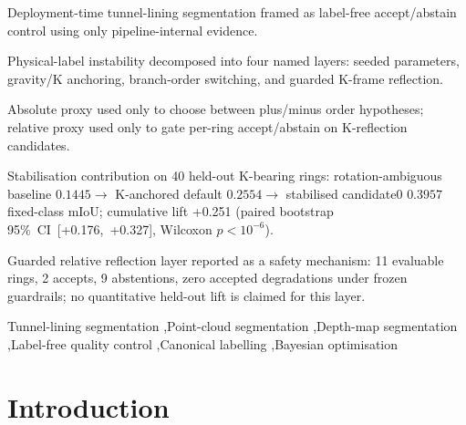 \documentclass[a4paper,fleqn]{cas-dc}
\begin{document}
{%

\begin{highlights}
\item Deployment-time tunnel-lining segmentation framed as label-free accept/abstain control using only pipeline-internal evidence.
\item Physical-label instability decomposed into four named layers: seeded parameters, gravity/K anchoring, branch-order switching, and guarded K-frame reflection.
\item Absolute proxy used only to choose between plus/minus order hypotheses; relative proxy used only to gate per-ring accept/abstain on K-reflection candidates.
\item Stabilisation contribution on 40 held-out K-bearing rings: rotation-ambiguous baseline $0.1445 \to$ K-anchored default $0.2554 \to$ stabilised candidate0 $0.3957$ fixed-class mIoU; cumulative lift +0.251 (paired bootstrap 95\%~CI~[+0.176,~+0.327], Wilcoxon $p<10^{-6}$).
\item Guarded relative reflection layer reported as a safety mechanism: 11 evaluable rings, 2 accepts, 9 abstentions, zero accepted degradations under frozen guardrails; no quantitative held-out lift is claimed for this layer.
\end{highlights}


\begin{keywords}
Tunnel-lining segmentation \sep Point-cloud segmentation \sep Depth-map segmentation \sep Label-free quality control \sep Canonical labelling \sep Bayesian optimisation
\end{keywords}

\maketitle
}

\smallskip

\section{Introduction}\label{sec:intro}
\end{document}
